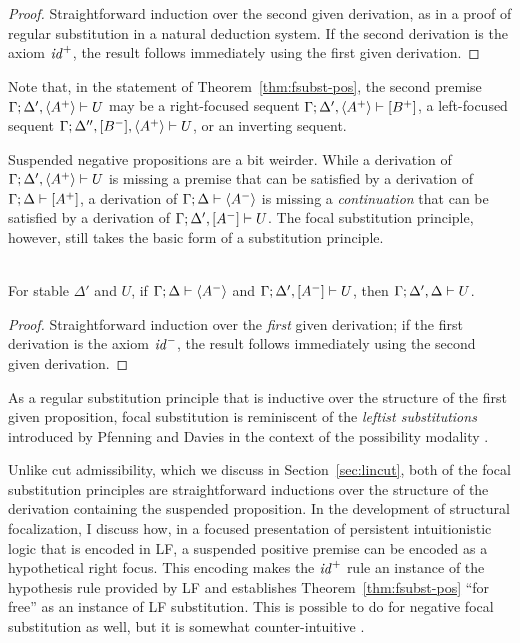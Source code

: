 \begin{proof}
  Straightforward induction over the second given derivation, as in a
  proof of regular substitution in a natural deduction system. If the
  second derivation is the axiom ${\it id}^+$, the result follows
  immediately using the first given derivation.
\end{proof}

\noindent
Note that, in the statement of Theorem~\ref{thm:fsubst-pos}, the
second premise ${\Gamma};{\Delta', \langle A^+ \rangle} \vdash {U} \mathstrut$ may
be a right-focused sequent ${\Gamma};{\Delta', \langle A^+
  \rangle} \vdash {[B^+]} \mathstrut$, a left-focused sequent ${\Gamma};{\Delta'',
  [B^-], \langle A^+ \rangle} \vdash {U} \mathstrut$, or an inverting sequent. 

Suspended negative propositions are a bit weirder. While a derivation
of ${\Gamma};{\Delta', \langle A^+ \rangle} \vdash {U} \mathstrut$ is missing a
premise that can be satisfied by a derivation of
${\Gamma};{\Delta} \vdash {[A^+]} \mathstrut$, a derivation of 
${\Gamma};{\Delta} \vdash {\langle A^- \rangle} \mathstrut$ is missing a 
{\it continuation} that can be satisfied by a derivation of
${\Gamma};{\Delta', [A^-]} \vdash {U} \mathstrut$. The focal substitution principle,
however, still takes the basic form of a substitution principle.

\bigskip
\begin{theorem}\label{thm:fsubst-neg}~\\
For stable $\Delta'$ and $U$, 
if ${\Gamma};{\Delta} \vdash {\langle A^- \rangle} \mathstrut$
and ${\Gamma};{\Delta', [A^-]} \vdash {U} \mathstrut$, 
then ${\Gamma};{\Delta', \Delta} \vdash {U} \mathstrut$. 
\end{theorem}

\begin{proof}
  Straightforward induction over the {\it first} given derivation; if
  the first derivation is the axiom ${\it id}^-$, the result follows
  immediately using the second given derivation.
\end{proof}

\noindent
As a regular substitution principle that is inductive over the structure
of the first given proposition, focal substitution is reminiscent of 
the {\it leftist substitutions} introduced by Pfenning and Davies in the 
context of the possibility modality \cite{pfenning01judgmental}.

Unlike cut admissibility, which we discuss in Section~\ref{sec:lincut}, both
of the focal substitution principles are straightforward inductions
over the structure of the derivation containing the suspended
proposition. In the development of structural focalization, I discuss
how, in a focused presentation of persistent intuitionistic logic that
is encoded in LF, a suspended positive premise can be encoded as a
hypothetical right focus. This encoding makes the ${\it id}^+$ rule an
instance of the hypothesis rule provided by LF and establishes
Theorem~\ref{thm:fsubst-pos} ``for free'' as an instance of LF
substitution. This is possible to do for negative focal substitution
as well, but it is somewhat counter-intuitive
\cite{simmons11structural}.

